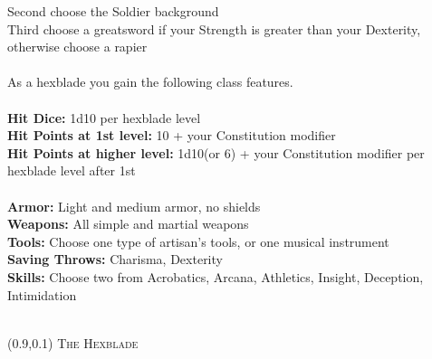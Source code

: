 \documentclass[a4paper]{article}
\begin{document}
\begin{multicols}{2}
Second choose the Soldier background\\
Third choose a greatsword if your Strength is greater than your Dexterity, otherwise choose a rapier\\
\\
As a hexblade you gain the following class features.\\
\\
\textbf{Hit Dice:} 1d10 per hexblade level\\
\textbf{Hit Points at 1st level:} 10 + your Constitution modifier\\
\textbf{Hit Points at higher level:} 1d10(or 6) + your Constitution modifier per hexblade level after 1st\\
\\
\textbf{Armor:} Light and medium armor, no shields\\
\textbf{Weapons:} All simple and martial weapons\\
\textbf{Tools:} Choose one type of artisan's tools, or one musical instrument\\
\textbf{Saving Throws:} Charisma, Dexterity\\
\textbf{Skills:} Choose two from Acrobatics, Arcana, Athletics, Insight, Deception, Intimidation\\
\\
\end{multicols}
\newpage
\restoregeometry
{}
\begin{textblock}{16}(0.9,0.1)
\textsc{The Hexblade}
\end{textblock}
\end{document}

